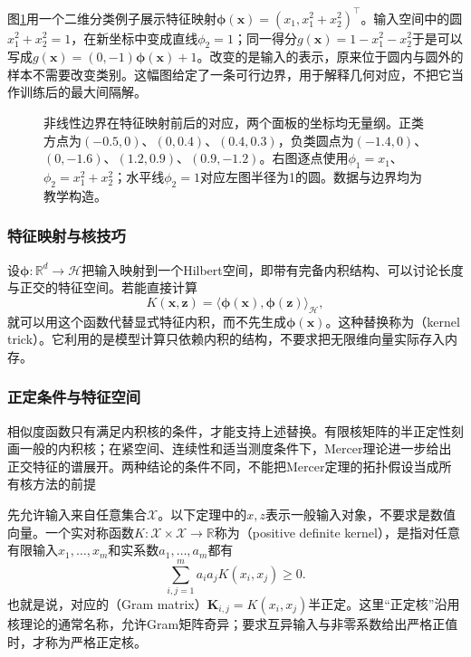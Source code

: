 图\ref{fig:classification-kernel-map}用一个二维分类例子展示特征映射$\bm{\phi}(\bm{x})=(x_1,x_1^2+x_2^2)^{\top}$。输入空间中的圆$x_1^2+x_2^2=1$，在新坐标中变成直线$\phi_2=1$；同一得分$g(\bm{x})=1-x_1^2-x_2^2$于是可以写成$g(\bm{x})=(0,-1)\bm{\phi}(\bm{x})+1$。改变的是输入的表示，原来位于圆内与圆外的样本不需要改变类别。这幅图给定了一条可行边界，用于解释几何对应，不把它当作训练后的最大间隔解。

\begin{figure}[htbp]
  \centering
  
  \caption{非线性边界在特征映射前后的对应，两个面板的坐标均无量纲。正类方点为$(-0.5,0)$、$(0,0.4)$、$(0.4,0.3)$，负类圆点为$(-1.4,0)$、$(0,-1.6)$、$(1.2,0.9)$、$(0.9,-1.2)$。右图逐点使用$\phi_1=x_1$、$\phi_2=x_1^2+x_2^2$；水平线$\phi_2=1$对应左图半径为1的圆。数据与边界均为教学构造。}
  \label{fig:classification-kernel-map}
\end{figure}

\subsubsection{特征映射与核技巧}
\label{sec:classic-overview-kernel-trick}
\label{sec:classification-svm-kernel-trick}

设$\bm{\phi}:\mathbb{R}^d\to\mathcal{H}$把输入映射到一个Hilbert空间，即带有完备内积结构、可以讨论长度与正交的特征空间。若能直接计算
\begin{equation}
  K(\bm{x},\bm{z})
  =\langle\bm{\phi}(\bm{x}),\bm{\phi}(\bm{z})\rangle_{\mathcal{H}},
  \label{eq:classic-overview-kernel}
\end{equation}
就可以用这个函数代替显式特征内积，而不先生成$\bm{\phi}(\bm{x})$。这种替换称为（kernel trick）。它利用的是模型计算只依赖内积的结构，不要求把无限维向量实际存入内存。

\subsubsection{正定条件与特征空间}
\label{sec:classic-overview-kernel-validity}
\label{sec:classification-svm-mercer}

相似度函数只有满足内积核的条件，才能支持上述替换。有限核矩阵的半正定性刻画一般的内积核；在紧空间、连续性和适当测度条件下，Mercer理论进一步给出正交特征的谱展开。两种结论的条件不同，不能把Mercer定理的拓扑假设当成所有核方法的前提

先允许输入来自任意集合$\mathcal{X}$。以下定理中的$x,z$表示一般输入对象，不要求是数值向量。一个实对称函数$K:\mathcal{X}\times\mathcal{X}\to\mathbb{R}$称为（positive definite kernel），是指对任意有限输入$x_1,\ldots,x_m$和实系数$a_1,\ldots,a_m$都有
\[
  \sum_{i,j=1}^m a_i a_j K(x_i,x_j)\ge0.
\]
也就是说，对应的（Gram matrix）$\bm{K}_{i,j}=K(x_i,x_j)$半正定。这里“正定核”沿用核理论的通常名称，允许Gram矩阵奇异；要求互异输入与非零系数给出严格正值时，才称为严格正定核。

